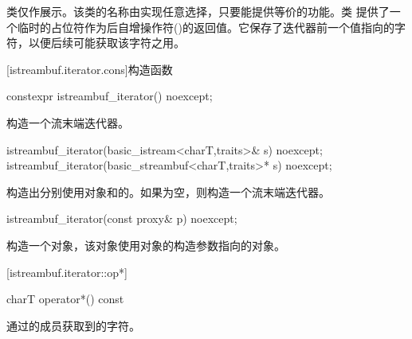 \pnum
类仅作展示。该类的名称由实现任意选择，只要能提供等价的功能。类 提供了一个临时的占位符作为后自增操作符()的返回值。它保存了迭代器前一个值指向的字符，以便后续可能获取该字符之用。

[istreambuf.iterator.cons]{构造函数}


%
\begin{itemdecl}
constexpr istreambuf_iterator() noexcept;
\end{itemdecl}

\begin{itemdescr}
\pnum
\effects
构造一个流末端迭代器。
\end{itemdescr}


%
\begin{itemdecl}
istreambuf_iterator(basic_istream<charT,traits>& s) noexcept;
istreambuf_iterator(basic_streambuf<charT,traits>* s) noexcept;
\end{itemdecl}

\begin{itemdescr}
\pnum
\effects
构造出分别使用对象和的。如果为空，则构造一个流末端迭代器。
\end{itemdescr}

%
\begin{itemdecl}
istreambuf_iterator(const proxy& p) noexcept;
\end{itemdecl}

\begin{itemdescr}
\pnum
\effects
构造一个对象，该对象使用对象的构造参数指向的对象。
\end{itemdescr}

[istreambuf.iterator::op*]{}

%
\begin{itemdecl}
charT operator*() const
\end{itemdecl}

\begin{itemdescr}
\pnum
\returns
通过的成员获取到的字符。
\end{itemdescr}

